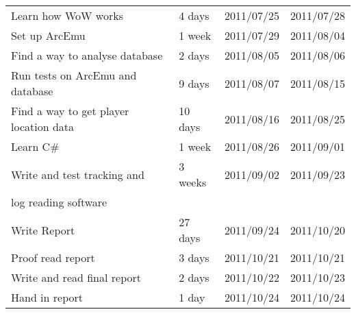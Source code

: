 \begin{table}[htbp]
\begin{tabular}{llrr}
    Learn how WoW works & 4 days & 2011/07/25 & 2011/07/28 \\
    Set up ArcEmu & 1 week & 2011/07/29 & 2011/08/04 \\
    Find a way to analyse database & 2 days & 2011/08/05 & 2011/08/06 \\
    Run tests on ArcEmu and database & 9 days & 2011/08/07 & 2011/08/15 \\
    Find a way to get player location data & 10 days & 2011/08/16 & 2011/08/25 \\
    Learn C\# & 1 week & 2011/08/26 & 2011/09/01 \\
    Write and test tracking and & 3 weeks & 2011/09/02 & 2011/09/23 \\
    log reading software &       &       &  \\
    Write Report & 27 days & 2011/09/24 & 2011/10/20 \\
    Proof read report & 3 days & 2011/10/21 & 2011/10/21 \\
    Write and read final report & 2 days & 2011/10/22 & 2011/10/23 \\
    Hand in report & 1 day & 2011/10/24 & 2011/10/24 \\
    \bottomrule
    \end{tabular}%
\end{table}%
